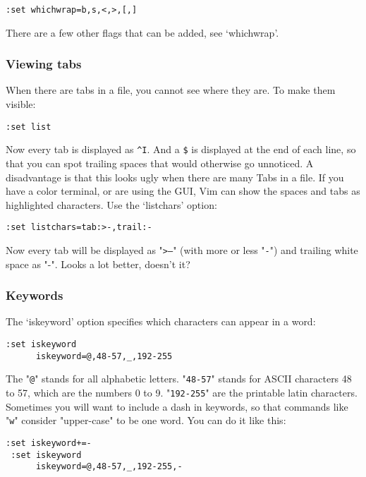  \begin{Verbatim}[samepage=true]
 :set whichwrap=b,s,<,>,[,]
 \end{Verbatim}

There are a few other flags that can be added, see `whichwrap'.

\subsubsection{Viewing tabs}
When there are tabs in a file, you cannot see where they are.
To make them visible:

 \begin{Verbatim}[samepage=true]
 :set list
 \end{Verbatim}

Now every tab is displayed as \texttt{\^{}I}.
And a \texttt{\$} is displayed at the end of each line, so that you can spot trailing spaces that would otherwise go unnoticed.
A disadvantage is that this looks ugly when there are many Tabs in a file.
If you have a color terminal, or are using the GUI, Vim can show the spaces and tabs as highlighted characters.
Use the `listchars' option:

 \begin{Verbatim}[samepage=true]
 :set listchars=tab:>-,trail:-
 \end{Verbatim}

Now every tab will be displayed as "\texttt{>---}" (with more or less "\texttt{-}") and trailing white space as "-".
Looks a lot better, doesn't it?

\subsubsection{Keywords}
The `iskeyword' option specifies which characters can appear in a word:

\begin{Verbatim}[samepage=true]
 :set iskeyword
      iskeyword=@,48-57,_,192-255 
\end{Verbatim}

The "\texttt{@}" stands for all alphabetic letters.
"\texttt{48-57}" stands for ASCII characters 48 to 57, which are the numbers 0 to 9.
"\texttt{192-255}" are the printable latin characters.
Sometimes you will want to include a dash in keywords, so that commands like "\texttt{w}" consider "upper-case" to be one word.
You can do it like this:

\begin{Verbatim}[samepage=true]
 :set iskeyword+=-
 :set iskeyword
      iskeyword=@,48-57,_,192-255,- 
\end{Verbatim}


